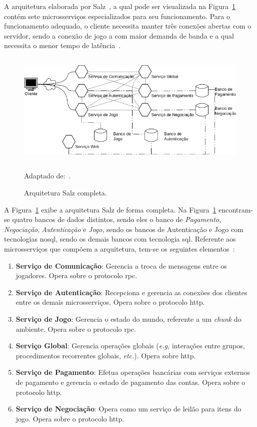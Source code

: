 A arquitetura elaborada por Salz~\cite{albion_online_unite}, a qual pode ser visualizada na Figura~\ref{full_salz} contém sete microsserviços especializados para seu funcionamento.
%
Para o funcionamento adequado, o cliente necessita manter três conexões abertas com o servidor, sendo a conexão de jogo a com maior demanda de banda e a qual necessita o menor tempo de latência~\cite{albion_online_unite}.

\begin{figure}[htb!]
  \caption{Arquitetura Salz completa.}
  \label{full_salz}
  \includegraphics[height=5.5cm]{arquiteturas/full_salz.png}
  \centering

  Adaptado de:~\cite{albion_online_unite}.
\end{figure}



A Figura~\ref{full_salz} exibe a arquitetura Salz de forma completa.
%
Na Figura~\ref{full_salz} encontram-se quatro bancos de dados distintos, sendo eles o banco de \textit{Pagamento}, \textit{Negociação}, \textit{Autenticação} e \textit{Jogo}, sendo os bancos de Autenticação e Jogo com tecnologias \ac{nosql}, sendo os demais bancos com tecnologia \ac{sql}.
%
Referente aos microsserviços que compõem a arquitetura, tem-se os seguintes elementos~\cite{salz_albion}:



\begin{enumerate}
  \item \textbf{Serviço de Comunicação}: Gerencia a troca de mensagens entre os jogadores. Opera sobre o protocolo \ac{rpc}.
  \item \textbf{Serviço de Autenticação}: Recepciona e gerencia as conexões dos clientes entre os demais microsserviços. Opera sobre o protocolo \ac{http}.
  \item \textbf{Serviço de Jogo}: Gerencia o estado do mundo, referente a um \textit{chunk} do ambiente. Opera sobre o protocolo \ac{rpc}.
  \item \textbf{Serviço Global}: Gerencia operações globais (\textit{e.g,} interações entre grupos, procedimentos recorrentes globais, \textit{etc.}). Opera sobre \ac{http}.
  \item \textbf{Serviço de Pagamento}: Efetua operações bancárias com serviços externos de pagamento e gerencia o estado de pagamento das contas. Opera sobre o protocolo \ac{http}.
  \item \textbf{Serviço de Negociação}: Opera como um serviço de leilão para itens do jogo. Opera sobre o protocolo \ac{http}.
\end{enumerate}



